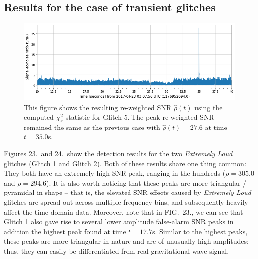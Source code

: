 \documentclass[preprint,
letterpaper,
 amsmath,amssymb,
 aps,
]{revtex4-2}
\begin{document}
\subsection{Results for the case of transient glitches}

\begin{figure}[t]
\includegraphics[width = .9\textwidth]{reweighted glitch 5.png}
\caption{This figure shows the resulting re-weighted SNR $\hat{\rho}(t)$ using the computed $\chi^2_r$ statistic for Glitch 5. The peak re-weighted SNR remained the same as the previous case with $\hat{\rho}(t)=27.6$ at time $t=35.0$s.}
\centering
\end{figure}

Figures 23.\ and 24.\ show the detection results for the two \textit{Extremely Loud} glitches (Glitch 1 and Glitch 2). Both of these results share one thing common: They both have an extremely high SNR peak, ranging in the hundreds ($\rho=305.0$ and $\rho=294.6$). It is also worth noticing that these peaks are more triangular / pyramidal in shape – that is, the elevated SNR effects caused by \textit{Extremely Loud} glitches are spread out across multiple frequency bins, and subsequently heavily affect the time-domain data. Moreover, note that in FIG.\ 23., we can see that Glitch 1 also gave rise to several lower amplitude false-alarm SNR peaks in addition the highest peak found at time $t=17.7$s. Similar to the highest peaks, these peaks are more triangular in nature and are of unusually high amplitudes; thus, they can easily be differentiated from real gravitational wave signal. 
\end{document}
